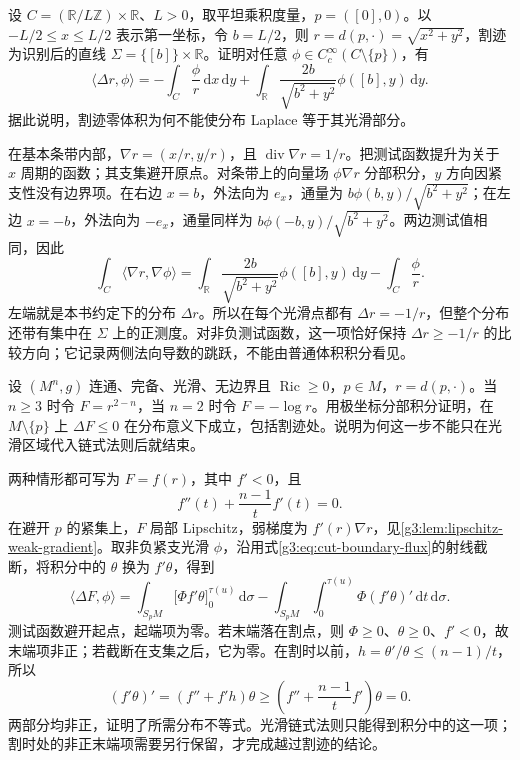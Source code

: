 \begin{exercise}\label{g3:ex:cylinder-cut-laplacian-measure}
	设 \(C=(\mathbb R/L\mathbb Z)\times\mathbb R\)、\(L>0\)，取平坦乘积度量，\(p=([0],0)\)。以 \(-L/2\le x\le L/2\) 表示第一坐标，令 \(b=L/2\)，则 \(r=d(p,\cdot)=\sqrt{x^2+y^2}\)，割迹为识别后的直线 \(\Sigma=\{[b]\}\times\mathbb R\)。证明对任意 \(\phi\in C_c^\infty(C\setminus\{p\})\)，有
	\[
		\langle\Delta r,\phi\rangle
		=-\int_C\frac{\phi}{r}\,\mathrm{d}x\,\mathrm{d}y
		+\int_{\mathbb R}\frac{2b}{\sqrt{b^2+y^2}}\phi([b],y)\,\mathrm{d}y.
	\]
	据此说明，割迹零体积为何不能使分布 Laplace 等于其光滑部分。
\end{exercise}
\begin{solution}
	在基本条带内部，\(\nabla r=(x/r,y/r)\)，且 \(\operatorname{div}\nabla r=1/r\)。把测试函数提升为关于 \(x\) 周期的函数；其支集避开原点。对条带上的向量场 \(\phi\nabla r\) 分部积分，\(y\) 方向因紧支性没有边界项。在右边 \(x=b\)，外法向为 \(e_x\)，通量为 \(b\phi(b,y)/\sqrt{b^2+y^2}\)；在左边 \(x=-b\)，外法向为 \(-e_x\)，通量同样为 \(b\phi(-b,y)/\sqrt{b^2+y^2}\)。两边测试值相同，因此
	\[
		\int_C\langle\nabla r,\nabla\phi\rangle
		=\int_{\mathbb R}\frac{2b}{\sqrt{b^2+y^2}}\phi([b],y)\,\mathrm{d}y
		-\int_C\frac{\phi}{r}.
	\]
	左端就是本书约定下的分布 \(\Delta r\)。所以在每个光滑点都有 \(\Delta r=-1/r\)，但整个分布还带有集中在 \(\Sigma\) 上的正测度。对非负测试函数，这一项恰好保持 \(\Delta r\ge-1/r\) 的比较方向；它记录两侧法向导数的跳跃，不能由普通体积积分看见。
\end{solution}

\begin{exercise}\label{g3:ex:radial-potential-weak-sign}
	设 \((M^n,g)\) 连通、完备、光滑、无边界且 \(\operatorname{Ric}\ge0\)，\(p\in M\)，\(r=d(p,\cdot)\)。当 \(n\ge3\) 时令 \(F=r^{2-n}\)，当 \(n=2\) 时令 \(F=-\log r\)。用极坐标分部积分证明，在 \(M\setminus\{p\}\) 上 \(\Delta F\le0\) 在分布意义下成立，包括割迹处。说明为何这一步不能只在光滑区域代入链式法则后就结束。
\end{exercise}
\begin{solution}
	两种情形都可写为 \(F=f(r)\)，其中 \(f'<0\)，且
	\[
		f''(t)+\frac{n-1}{t}f'(t)=0.
	\]
	在避开 \(p\) 的紧集上，\(F\) 局部 Lipschitz，弱梯度为 \(f'(r)\nabla r\)，见\cref{g3:lem:lipschitz-weak-gradient}。取非负紧支光滑 \(\phi\)，沿用式\eqref{g3:eq:cut-boundary-flux}的射线截断，将积分中的 \(\theta\) 换为 \(f'\theta\)，得到
	\[
		\langle\Delta F,\phi\rangle
		=\int_{S_pM}\bigl[\Phi f'\theta\bigr]_0^{\tau(u)}\,\mathrm{d}\sigma
		-\int_{S_pM}\int_0^{\tau(u)}\Phi(f'\theta)'\,\mathrm{d}t\,\mathrm{d}\sigma.
	\]
	测试函数避开起点，起端项为零。若末端落在割点，则 \(\Phi\ge0\)、\(\theta\ge0\)、\(f'<0\)，故末端项非正；若截断在支集之后，它为零。在割时以前，\(h=\theta'/\theta\le(n-1)/t\)，所以
	\[
		(f'\theta)'=(f''+f'h)\theta
		\ge\left(f''+\frac{n-1}{t}f'\right)\theta=0.
	\]
	两部分均非正，证明了所需分布不等式。光滑链式法则只能得到积分中的这一项；割时处的非正末端项需要另行保留，才完成越过割迹的结论。
\end{solution}

